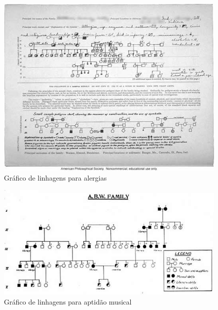 \documentclass[
]{book}
\begin{document}
\begin{figure}

{\centering \includegraphics[width=0.75\linewidth]{images1/chart_pedigree_allergy2} 

}

\caption{Gráfico de linhagens para alergias}\label{fig:figA14}
\end{figure}

\hfill\break

\begin{figure}

{\centering \includegraphics[width=0.75\linewidth]{images1/chart_pedigree_music2 (1)} 

}

\caption{Gráfico de linhagens para aptidão musical}\label{fig:figA15}
\end{figure}

\hfill\break
\end{document}
